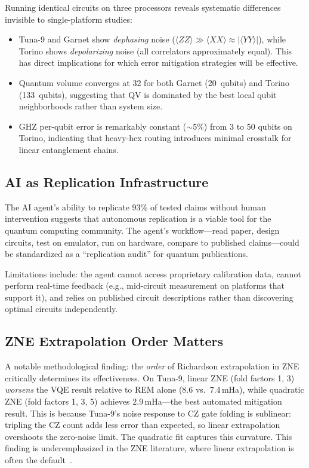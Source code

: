 \documentclass[twocolumn,prl,superscriptaddress,nofootinbib]{revtex4-2}
\begin{document}
Running identical circuits on three processors reveals systematic differences invisible to single-platform studies:
\begin{itemize}
  \item Tuna-9 and Garnet show \emph{dephasing} noise ($\langle ZZ \rangle \gg \langle XX \rangle \approx |\langle YY \rangle|$), while Torino shows \emph{depolarizing} noise (all correlators approximately equal). This has direct implications for which error mitigation strategies will be effective.
  \item Quantum volume converges at 32 for both Garnet (20~qubits) and Torino (133~qubits), suggesting that QV is dominated by the best local qubit neighborhoods rather than system size.
  \item GHZ per-qubit error is remarkably constant ($\sim$5\%) from 3 to 50 qubits on Torino, indicating that heavy-hex routing introduces minimal crosstalk for linear entanglement chains.
\end{itemize}

\subsection{AI as Replication Infrastructure}

The AI agent's ability to replicate 93\% of tested claims without human intervention suggests that autonomous replication is a viable tool for the quantum computing community.
The agent's workflow---read paper, design circuits, test on emulator, run on hardware, compare to published claims---could be standardized as a ``replication audit'' for quantum publications.

Limitations include: the agent cannot access proprietary calibration data, cannot perform real-time feedback (e.g., mid-circuit measurement on platforms that support it), and relies on published circuit descriptions rather than discovering optimal circuits independently.

\subsection{ZNE Extrapolation Order Matters}

A notable methodological finding: the \emph{order} of Richardson extrapolation in ZNE critically determines its effectiveness.
On Tuna-9, linear ZNE (fold factors 1, 3) \emph{worsens} the VQE result relative to REM alone (8.6 vs.\ 7.4\,mHa), while quadratic ZNE (fold factors 1, 3, 5) achieves 2.9\,mHa---the best automated mitigation result.
This is because Tuna-9's noise response to CZ gate folding is sublinear: tripling the CZ count adds less error than expected, so linear extrapolation overshoots the zero-noise limit.
The quadratic fit captures this curvature.
This finding is underemphasized in the ZNE literature, where linear extrapolation is often the default~\cite{temme2017,li2017}.
\end{document}
